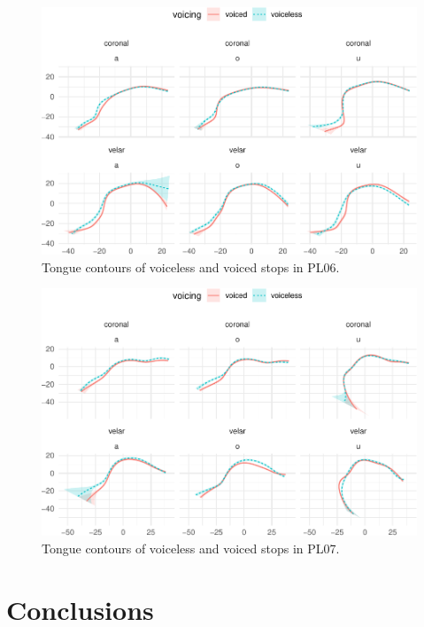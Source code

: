 \documentclass[12pt,]{article}
\begin{document}
\begin{figure}

{\centering \includegraphics[width=.8\textwidth]{2018-polar-gam_files/figure-latex/tongues-pl06-1} 

}

\caption{Tongue contours of voiceless and voiced stops in PL06.}\label{f:tongues-pl06}
\end{figure}

\begin{figure}

{\centering \includegraphics[width=.8\textwidth]{2018-polar-gam_files/figure-latex/tongues-pl07-1} 

}

\caption{Tongue contours of voiceless and voiced stops in PL07.}\label{f:tongues-pl07}
\end{figure}

\hypertarget{conclusions}{%
\section{Conclusions}\label{conclusions}}
\end{document}
